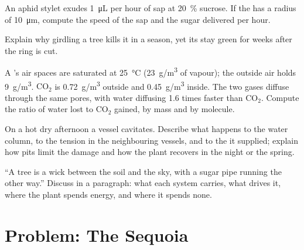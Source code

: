 \begin{exercise}[$\star\star$]\label{exo:b1:plant-transport:8}
An aphid stylet exudes \qty{1}{\micro L} per hour of sap at
\qty{20}{\%} sucrose. If the  has a radius of
\qty{10}{\micro m}, compute the speed of the sap and the sugar
delivered per hour.
\end{exercise}

\begin{exercise}[$\star\star$]\label{exo:b1:plant-transport:9}
Explain why girdling a tree kills it in a season, yet its 
stay green for weeks after the ring is cut.
\end{exercise}

\begin{exercise}[$\star\star\star$]\label{exo:b1:plant-transport:10}
A 's air spaces are saturated at \qty{25}{\celsius}
(\qty{23}{g/m^3} of vapour); the outside air holds \qty{9}{g/m^3}.
$\mathrm{CO_2}$ is \qty{0.72}{g/m^3} outside and \qty{0.45}{g/m^3}
inside. The two gases diffuse through the same pores, with water
diffusing 1.6 times faster than $\mathrm{CO_2}$. Compute the ratio of
water lost to $\mathrm{CO_2}$ gained, by mass and by molecule.
\end{exercise}

\begin{exercise}[$\star\star\star$]\label{exo:b1:plant-transport:11}
On a hot dry afternoon a vessel cavitates. Describe what happens to
the water column, to the tension in the neighbouring vessels, and to
the  it supplied; explain how pits limit the damage and how the
plant recovers in the night or the spring.
\end{exercise}

\begin{exercise}[$\star\star\star$]\label{exo:b1:plant-transport:12}
``A tree is a wick between the soil and the sky, with a sugar pipe
running the other way.'' Discuss in a paragraph: what each system
carries, what drives it, where the plant spends energy, and where it
spends none.
\end{exercise}

\section{Problem: The Sequoia}

